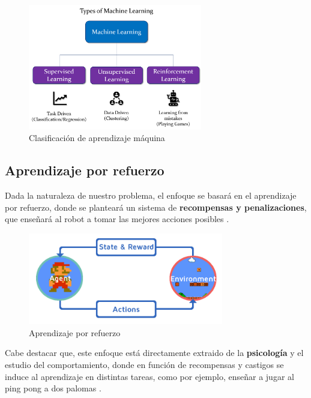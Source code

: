 \begin{figure} [H]
	\begin{center}
	\includegraphics[height=5.5cm]{imagenes/cap1/8_AI_types.png}
	\end{center}
	\caption[Clasificación de aprendizaje máquina]{Clasificación de aprendizaje máquina}
	\label{fig:ai_types}
\end{figure}

\subsection{Aprendizaje por refuerzo}
\label{subsec:aprendizaje_por_refuerzo}

Dada la naturaleza de nuestro problema, el enfoque se basará en el aprendizaje por refuerzo, donde se planteará un sistema de \textbf{recompensas y penalizaciones}, que enseñará al robot a tomar las mejores acciones posibles \cite{learn}.\\

\begin{figure} [H]
	\begin{center}
	\includegraphics[height=4cm]{imagenes/cap1/9_reinforcement.png}
	\end{center}
	\caption[Aprendizaje por refuerzo]{Aprendizaje por refuerzo}
	\label{fig:reinforcement_learning}
\end{figure}

Cabe destacar que, este enfoque está directamente extraido de la \textbf{psicología} y el estudio del comportamiento, donde en función de recompensas y castigos se induce al aprendizaje en distintas tareas, como por ejemplo, enseñar a jugar al ping pong a dos palomas \cite{psicologia-aprendizaje} \cite{skinner}.\\

